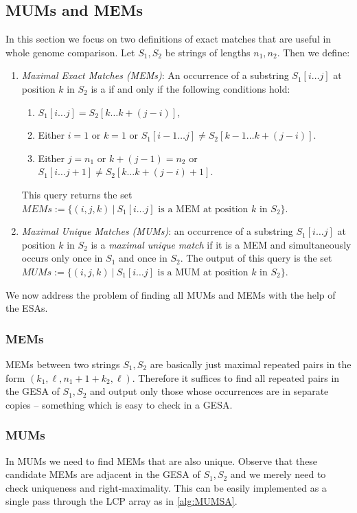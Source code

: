 \subsection{MUMs and MEMs}
In this section we focus on two definitions of exact matches that are useful in whole genome comparison.
Let $S_1, S_2$ be strings of lengths $n_1, n_2$.
Then we define:

\begin{enumerate}
    \item \textit{Maximal Exact Matches (MEMs)}: An occurrence of a substring $S_1[i \ldots j]$ at position $k$ in $S_2$ is a  if and only if the following conditions hold:
    \begin{enumerate}
        \item $S_1[i \ldots j] = S_2[k \ldots k + (j-i)]$,
        \item Either $i = 1$ or $k = 1$ or $S_1[i-1 \ldots j] \neq S_2[k-1 \ldots k + (j-i)]$.
        \item Either $j = n_1$ or $k+(j-1) = n_2$ or $S_1[i \ldots j+1] \neq S_2[k \ldots k + (j-i)+ 1]$.
    \end{enumerate}
    This query returns the set $MEMs := \{(i, j, k) ~|~ S_1[i \ldots j] \text{ is a MEM at position } k \text{ in } S_2 \}$.
    \item \textit{Maximal Unique Matches (MUMs)}: an occurrence of a substring $S_1[i \ldots j]$ at position $k$ in $S_2$ is a \textit{maximal unique match} if it is a MEM and simultaneously occurs only once in $S_1$ and once in $S_2$. The output of this query is the set $MUMs := \{ (i, j, k) ~|~ S_1[i \ldots j] \text{ is a MUM at position } k \text{ in } S_2 \}$.
\end{enumerate}

We now address the problem of finding all MUMs and MEMs with the help of the ESAs.

\subsubsection{MEMs}
MEMs between two strings $S_1, S_2$ are basically just maximal repeated pairs in the form $(k_1, \ell, n_1 + 1 + k_2, \ell)$.
Therefore it suffices to find all repeated pairs in the GESA of $S_1, S_2$ and output only those whose occurrences are in separate copies -- something which is easy to check in a GESA.

\subsubsection{MUMs}
In MUMs we need to find MEMs that are also unique.
Observe that these candidate MEMs are adjacent in the GESA of $S_1, S_2$ and we merely need to check uniqueness and right-maximality.
This can be easily implemented as a single pass through the LCP array as in \ref{alg:MUMSA}.

